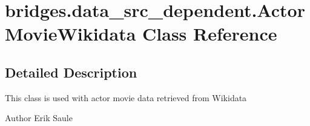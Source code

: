 \hypertarget{classbridges_1_1data__src__dependent_1_1_actor_movie_wikidata}{}\section{bridges.\+data\+\_\+src\+\_\+dependent.\+Actor\+Movie\+Wikidata Class Reference}
\label{classbridges_1_1data__src__dependent_1_1_actor_movie_wikidata}


\subsection{Detailed Description}
This class is used with actor movie data retrieved from Wikidata

\begin{DoxyAuthor}{Author}
Erik Saule 
\end{DoxyAuthor}
